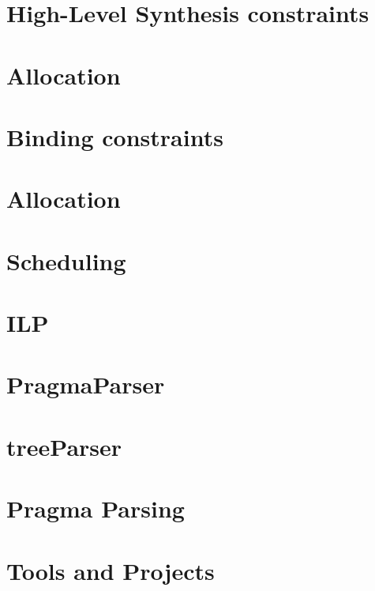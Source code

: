\documentclass[a4paper]{book}
\begin{document}
\chapter{High-\/\+Level Synthesis constraints}
\label{src_HLS_constraints_page}

\chapter{Allocation}
\label{src_HLS_allocation_page}

\chapter{Binding constraints}
\label{src_HLS_binding_constraints_page}

\chapter{Allocation}
\label{Allocation}

\chapter{Scheduling}
\label{src_HLS_scheduling_general}

\chapter{I\+LP}
\label{src_ilp_page}

\chapter{Pragma\+Parser}
\label{src_frontend_pragma}

\chapter{tree\+Parser}
\label{src_frontend_treegcc}

\chapter{Pragma Parsing}
\label{src_pragma_page}

\chapter{Tools and Projects}
\label{src_main_page}

\end{document}
